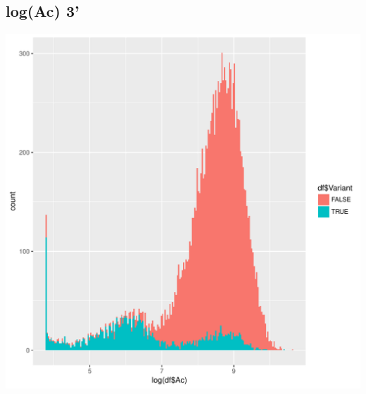 \documentclass{article}\usepackage[]{graphicx}\usepackage[]{color}
\newenvironment{knitrout}{}{} %
\begin{document}
\subsection{log(Ac) 3'}
\begin{knitrout}
\color{fgcolor}
\includegraphics[width=1\linewidth]{figure/dens_3_met-1} 

\end{knitrout}
\end{document}
